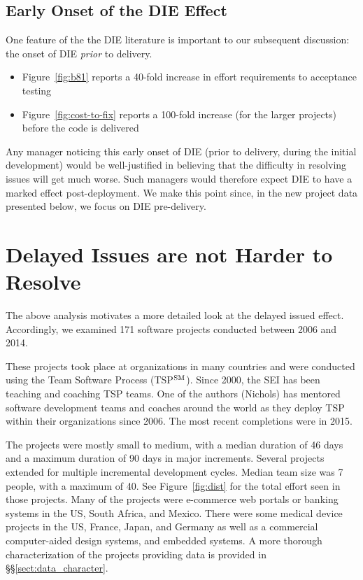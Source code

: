 \documentclass[smallcondensed]{svjour3}
\newcommand{\bi}{\begin{itemize}}%
\newcommand{\ei}{\end{itemize}}
\newcommand{\tion}[1]{\S\ref{sect:#1}}
\newcommand{\fig}[1]{Figure~\ref{fig:#1}}
\begin{document}
\subsection{Early Onset of the DIE Effect}\label{sect:earlyonset}

One feature of the the DIE literature is important to our subsequent discussion:   
the onset of  DIE  {\em prior} to delivery.
\bi
\item  
\fig{b81} reports a 40-fold increase in effort requirements to acceptance testing
\item
 \fig{cost-to-fix} reports a 100-fold increase
(for the larger projects) before the code is delivered 
\ei
Any manager noticing this  early onset of DIE (prior to delivery, during the initial development)
would be well-justified
in believing that  the difficulty in resolving issues  will get much worse. Such managers
would therefore expect DIE to have a marked effect post-deployment.
We make this point since,  in the new project data presented below, we focus on DIE pre-delivery.


 

\section{Delayed Issues are not  Harder  to Resolve}
\label{sect:analysis}
The above analysis motivates a more detailed look at the delayed issued effect.  
Accordingly, we examined 171 software projects conducted between 2006 and 2014. 

These projects took place at organizations in many countries and were conducted using  the Team Software Process (TSP$\textsuperscript{SM}$). Since 2000, the SEI has been teaching and coaching TSP teams. One of the authors (Nichols) has mentored software development teams and coaches around the world as they deploy TSP within their organizations since 2006.  The  most recent completions were in 2015.

The projects were mostly small to medium, with a median duration of 46 days and a maximum duration of 90 days in major increments. 
Several projects extended for multiple incremental development cycles. 
Median team size was 7 people, with a maximum of 40. See \fig{dist} for the total
effort seen in those projects. Many of the projects were e-commerce web portals or banking systems in the US, South Africa, and Mexico. 
There were  some  medical device projects in  the US, France, Japan, and Germany as well  as a commercial computer-aided design systems, and embedded systems. A more thorough characterization of the projects providing data is provided in \S\tion{data_character}.
\end{document}
